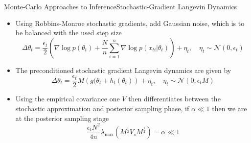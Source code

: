\documentclass[AERbeamer%
              ,optEnglish%
              ,optBiber%
              ,optBibstyleAlphabetic%
              ,optBeamerClassicFormat%
              ]{AERlatex}%
\begin{document}
\begin{frame}[c]{Monte-Carlo Approaches to Inference}{Stochastic-Gradient Langevin Dynamics}
    \centering
    \begin{itemize}
        \item Using Robbins-Monroe stochastic gradients, add Gaussian noise, which is to be balanced with the used step size
        \begin{equation*}
            \Delta \theta_{t} = \frac{\epsilon_{t}}{2} \left( \nabla \log p(\theta_{t}) + \frac{N}{n} \sum^{n}_{i=1} \nabla \log p(x_{ti} | \theta_{t}) \right) + \eta_{t}, \quad \eta_{t} \sim \mathcal{N}(0, \epsilon_{t})
        \end{equation*}
        \item The preconditioned stochastic gradient Langevin dynamics are given by
        \begin{equation*}
            \Delta \theta_{t} = \frac{\epsilon_{t}}{2} M \left( g(\theta_{t} + h_{t}(\theta_{t}) \right) + \eta_{t}, \quad \eta_{t} \sim \mathcal{N}(0, \epsilon_{t}M)
        \end{equation*}
        \item Using the empirical covariance one $V$ then differentiates between the stochastic approximation and posterior sampling phase, if $\alpha \ll 1$ then
              we are at the posterior sampling stage
        \begin{equation*}
            \frac{\epsilon_{t} N^{2}}{4n} \lambda_{\max} \left( M^{\frac{1}{2}} V_{s} M^{\frac{1}{2}} \right) = \alpha \ll 1
        \end{equation*}
    \end{itemize}
\end{frame}
\end{document}

